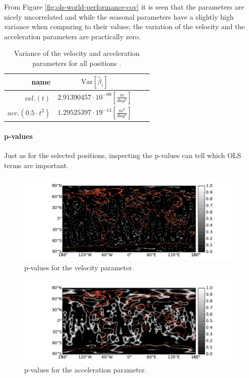 From Figure \ref{fig:ols-world-performance-cov} it is seen that the parameters are nicely uncorrelated and while the seasonal parameters have a slightly high variance when comparing to their values; the variation of the velocity and the acceleration parameters are practically zero.
\begin{table}[H]
\centering
\begin{tabular}{r|c c c}
	name & $\mathrm{Var}[\hat{\beta}_i]$ \\ \hline
	$vel. (t)$ & $2.91390457 \cdot 10^{-09} [\frac{m}{day^2}]$  \\
	$acc. (0.5 \cdot t^2)$ & $1.29525397 \cdot 19^{-14} [\frac{m^2}{day^4}]$
\end{tabular}
\caption{Variance of the velocity and acceleration parameters for all positions .}
\end{table}
\paragraph{p-values} Just as for the selected positions, inspecting the p-values can tell which OLS terms are important.

\begin{figure}[H]
	\centering
	\includegraphics[width=\textwidth]{figures/ols-world-diagnostics-pvalue-1}
	\caption{p-values for the velocity parameter.}
	\label{fig:ols-world-diagnostics-pvalue-1}
\end{figure}

\begin{figure}[H]
	\centering
	\includegraphics[width=\textwidth]{figures/ols-world-diagnostics-pvalue-2}
	\caption{p-values for the acceleration parameter.}
	\label{fig:ols-world-diagnostics-pvalue-2}
\end{figure}

